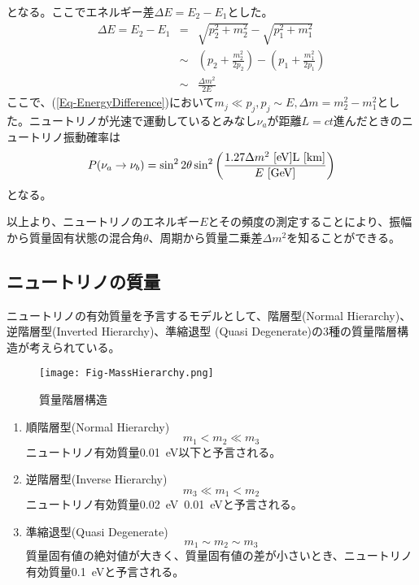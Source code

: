 \documentclass[a4paper,10pt]{jreport}
\begin{document}
となる。ここでエネルギー差$\Delta E=E_2-E_1$とした。
\begin{eqnarray} \label{Eq-EnergyDifference}
	\Delta E=E_2-E_1 &=& \sqrt{p_2^2+m_2^2}-\sqrt{p_1^2+m_1^2} \nonumber \\
	&\sim& \left( p_2+\frac{m_2^2}{2p_2} \right)-\left( p_1+\frac{m_1^2}{2p_1} \right) \nonumber \\
	&\sim& \frac{\Delta m^2}{2E}
\end{eqnarray}
ここで、(\ref{Eq-EnergyDifference})において$m_j\ll p_j,p_j\sim E,\Delta m=m_2^2-m_1^2$とした。ニュートリノが光速で運動しているとみなし$\nu_a$が距離$L=ct$進んだときのニュートリノ振動確率は
\begin{equation} \label{P_NeutrinoOscillation_c}
P(\nu_a\to\nu_b) = \sin^22\theta\sin^2\left(\frac{1.27\Delta m^2\ [\rm{eV}] L\ [\rm{km}]}{E\ [\rm{GeV}]}\right)
\end{equation}
となる。\cite{Syuron_2010}

以上より、ニュートリノのエネルギー$E$とその頻度の測定することにより、振幅から質量固有状態の混合角$\theta$、周期から質量二乗差$\Delta m^2$を知ることができる。



\subsection{ニュートリノの質量}

ニュートリノの有効質量を予言するモデルとして、階層型(Normal Hierarchy)、逆階層型(Inverted Hierarchy)、準縮退型 (Quasi Degenerate)の3種の質量階層構造が考えられている。

\begin{figure}[H]
	\center
	\texttt{[image: Fig-MassHierarchy.png]}
	\caption{質量階層構造} \label{Fig-MassHierarchy.png}
\end{figure}

\begin{enumerate}
	\item 順階層型(Normal Hierarchy) \\
	\begin{equation}
		m_1 < m_2 \ll m_3
	\end{equation}
	ニュートリノ有効質量\SI{0.01}{eV}以下と予言される。
	\item 逆階層型(Inverse Hierarchy) \\
	\begin{equation}
		m_3 \ll m_1 < m_2
	\end{equation}
	ニュートリノ有効質量\SI{0.02}{eV}~\SI{0.01}{eV}と予言される。
	\item 準縮退型(Quasi Degenerate) \\
	\begin{equation}
		m_1 \sim m_2 \sim m_3
	\end{equation}
	質量固有値の絶対値が大きく、質量固有値の差が小さいとき、ニュートリノ有効質量\SI{0.1}{eV}と予言される。
\end{enumerate}
\end{document}
